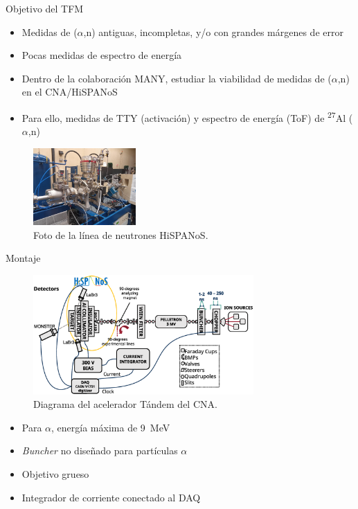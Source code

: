 \documentclass[11pt]{beamer}
\newcommand{\an}{($\alpha$,n) }
\newcommand{\Aliso}{\textsuperscript{27}Al }
\begin{document}
\begin{frame}{Objetivo del TFM}
	\begin{itemize}
		\item Medidas de \an antiguas, incompletas, y/o con grandes márgenes de error
		\item Pocas medidas de espectro de energía
		\item Dentro de la colaboración MANY, estudiar la viabilidad de medidas de \an en el CNA/HiSPANoS
		\item Para ello, medidas de TTY (activación) y espectro de energía (ToF) de \Aliso\an
	\end{itemize}
	\begin{figure}[H]
		\centering
		\includegraphics[width=0.35\textwidth]{neutronline_foto.jpg}
		\caption{Foto de la línea de neutrones HiSPANoS.}
		\label{}
	\end{figure}
\end{frame}

\begin{frame}{Montaje}
	\begin{figure}[H]
		\centering
		\includegraphics[width=0.75\textwidth]{tandemdiagrama.eps}
		\caption{Diagrama del acelerador Tándem del CNA.}
		\label{}
	\end{figure}
	\begin{itemize}
		\item Para $\alpha$, energía máxima de \qty{9}{\MeV}
		\item \textit{Buncher} no diseñado para partículas $\alpha$
		\item Objetivo grueso
		\item Integrador de corriente conectado al DAQ
	\end{itemize}
\end{frame}
\end{document}
